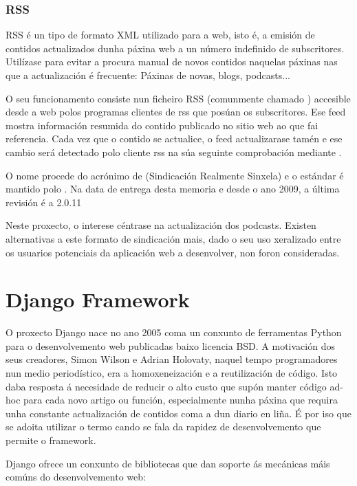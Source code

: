 \subsubsection{RSS}
\label{rss}

RSS é un tipo de formato XML utilizado para a  web, isto é, a emisión de contidos actualizados dunha páxina web a un número indefinido de subscritores. Utilízase para evitar a procura manual de novos contidos naquelas páxinas nas que a actualización é frecuente: Páxinas de novas, blogs, podcasts... 

O seu funcionamento consiste nun ficheiro RSS (comunmente chamado ) accesible desde a web polos programas clientes de rss que posúan os subscritores. Ese feed mostra información resumida do contido publicado no sitio web ao que fai referencia. Cada vez que o contido se actualice, o feed actualizarase tamén e ese cambio será detectado polo cliente rss na súa seguinte comprobación mediante .
 
O nome procede do acrónimo de (Sindicación Realmente Sinxela) e o estándar é mantido polo . Na data de entrega desta memoria e desde o ano 2009, a última revisión é a 2.0.11 \cite{rss}

Neste proxecto, o interese céntrase na actualización dos podcasts. Existen alternativas a este formato de sindicación mais, dado o seu uso xeralizado entre os usuarios potenciais da aplicación web a desenvolver, non foron consideradas.


\section{Django Framework}
\label{django}
O proxecto Django nace no ano 2005 coma un conxunto de ferramentas Python para o desenvolvemento web publicadas
baixo licencia BSD. A motivación dos seus creadores, Simon Wilson e Adrian Holovaty, naquel tempo programadores
nun medio periodístico, era a homoxeneización e a reutilización de código. Isto daba resposta á necesidade de reducir
o alto custo que supón manter código ad-hoc para cada novo artigo ou función, especialmente nunha páxina que
requira unha constante actualización de contidos coma a dun diario en liña. É por iso que se adoita utilizar o 
termo  cando se fala da rapidez de desenvolvemento que permite o framework\cite{django1}.  

Django ofrece un conxunto de bibliotecas que dan soporte ás mecánicas máis comúns do desenvolvemento
web:

